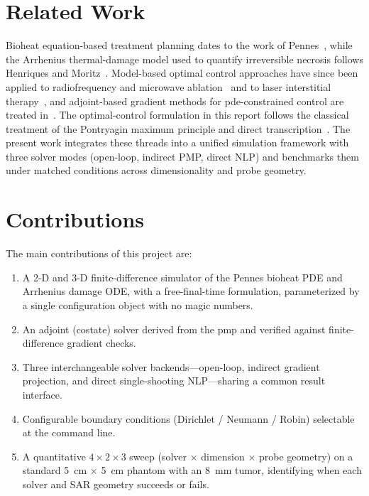 \section{Related Work}

Bioheat equation-based treatment planning dates to the work of
Pennes~\cite{pennes1948analysis}, while the Arrhenius thermal-damage
model used to quantify irreversible necrosis follows
Henriques and Moritz~\cite{moritz1947studies}.
Model-based optimal control approaches have since been applied to
radiofrequency and microwave ablation~\cite{diederich2005thermal} and to
laser interstitial therapy~\cite{feng2011model}, and adjoint-based
gradient methods for \gls{pde}-constrained control are treated
in~\cite{troltzsch2010optimal}.
The optimal-control formulation in this report follows the classical
treatment of the Pontryagin maximum principle and direct
transcription~\cite{pontryagin2018mathematical, kirk1970optimal,
liberzon2012calculus, biegler2010nonlinear}.
The present work integrates these threads into a unified simulation
framework with three solver modes (open-loop, indirect PMP, direct NLP)
and benchmarks them under matched conditions across dimensionality and
probe geometry.

\section{Contributions}

The main contributions of this project are:
\begin{enumerate}
    \item A 2-D and 3-D finite-difference simulator of the Pennes bioheat
          PDE and Arrhenius damage ODE, with a free-final-time formulation,
          parameterized by a single configuration object with no magic
          numbers.
    \item An adjoint (costate) solver derived from the \gls{pmp} and
          verified against finite-difference gradient checks.
    \item Three interchangeable solver backends—open-loop, indirect
          gradient projection, and direct single-shooting NLP—sharing a
          common result interface.
    \item Configurable boundary conditions (Dirichlet / Neumann / Robin)
          selectable at the command line.
    \item A quantitative $4 \times 2 \times 3$ sweep (solver $\times$
          dimension $\times$ probe geometry) on a standard
          5~cm $\times$ 5~cm phantom with an 8~mm tumor, identifying when
          each solver and SAR geometry succeeds or fails.
\end{enumerate}

